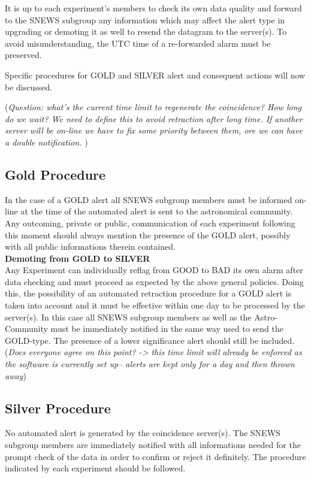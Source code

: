 \documentclass{article}
\begin{document}
It is up to each experiment's members to check
its own data quality and forward to the SNEWS subgroup any information
which may affect the alert type in upgrading or demoting it as well to
resend the datagram to the server(s).  To avoid misunderstanding, the
UTC time of a re-forwarded alarm must be preserved.
 
Specific procedures for GOLD and SILVER alert and consequent actions 
will now be discussed.

({\it Question: what's the current time limit to regenerate the coincidence?
How long do we wait? We need to define this to avoid retraction after long 
time. If another server will be on-line we have to fix some priority between 
them, ore we can have a double notification.
})

\subsection{Gold Procedure}\label{gold}

In the case of a GOLD alert all SNEWS subgroup members must be informed
on-line at the time of the automated alert is sent to the astronomical
community.
Any outcoming, private or public, communication of each experiment following 
this moment should always 
mention the presence of the GOLD alert, possibly with all public informations
therein contained.\\

{\bf Demoting from GOLD to SILVER}\\ Any Experiment can individually
reflag from GOOD to BAD its own alarm after data checking and must
proceed as expected by the above general policies.  Doing this, the
possibility of an automated retraction procedure for a GOLD alert is
taken into account and it must be effective within one day to be
processed by the server(s). In this case all SNEWS subgroup
members as well as the Astro-Community must be immediately notified in
the same way used to send the GOLD-type. The presence of a lower
significance alert should still be included.({\it Does everyone agree
on this point? -> this time limit will already be enforced as
the software is currently set up-- alerts are kept only for a day
and then thrown away})

\subsection{Silver Procedure}\label{silver}
No automated alert is generated by the coincidence server(s). 
The SNEWS subgroup members are immediately notified 
with all informations needed for the prompt check of the data in order to 
confirm or reject it definitely.
The procedure indicated by each experiment should be followed.\\
\end{document}
